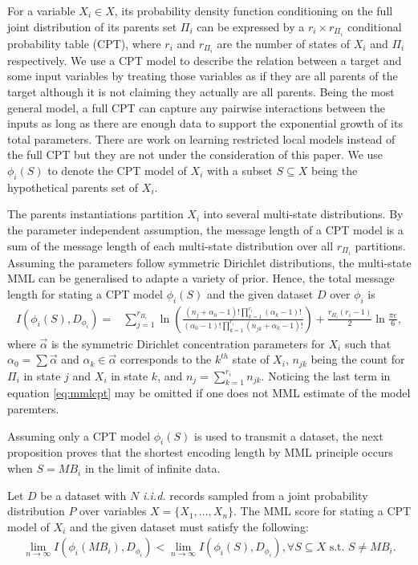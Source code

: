 For a variable $X_i \in X$, its probability density function conditioning on the full joint distribution of its parents set $\Pi_i$ can be expressed by a $r_i \times r_{\Pi_i}$ conditional probability table (CPT), where $r_i$ and $r_{\Pi_i}$ are the number of states of $X_i$ and $\Pi_i$ respectively. We use a CPT model to describe the relation between a target and some input variables by treating those variables as if they are all parents of the target although it is not claiming they actually are all parents. Being the most general model, a full CPT can capture any pairwise interactions between the inputs as long as there are enough data to support the exponential growth of its total parameters. There are work on learning restricted local models instead of the full CPT \cite{neil1999learning} but they are not under the consideration of this paper. We use $\phi_i(S)$ to denote the CPT model of $X_i$ with a subset $S \subseteq X$ being the hypothetical parents set of $X_i$.

The parents instantiations partition $X_i$ into several multi-state distributions. By the parameter independent assumption, the message length of a CPT model is a sum of the message length of each multi-state distribution over all $r_{\Pi_i}$ partitions. Assuming the parameters follow symmetric Dirichlet distributions, the multi-state MML can be generalised to adapte a variety of prior. Hence, the total message length for stating a CPT model $\phi_i(S)$ and the given dataset $D$ over ${\phi_i}$ is 
\begin{align}
\label{eq:mmlcpt}
I(\phi_i(S), D_{\phi_i}) = & \sum_{j = 1}^{r_{\Pi_i}} \ln \left(\frac{(n_j+\alpha_0-1)! \prod_{k=1}^{r_i} (\alpha_k - 1)!}{(\alpha_0-1)! \prod_{k=1}^{r_i} (n_{jk} + \alpha_k - 1)!} \right) + \frac{r_{\Pi_i}(r_i-1)}{2} \ln \frac{\pi e}{6},
\end{align}
where $\vec{\alpha}$ is the symmetric Dirichlet concentration parameters for $X_i$ such that $\alpha_0 = \sum \vec{\alpha}$ and $\alpha_k \in \vec{\alpha}$ corresponds to the $k^{th}$ state of $X_i$, $n_{jk}$ being the count for $\Pi_i$ in state $j$ and $X_i$ in state $k$, and $n_j = \sum_{k=1}^{r_i} n_{jk}$. Noticing the last term in equation \ref{eq:mmlcpt} may be omitted if one does not MML estimate of the model paremters. 

Assuming only a CPT model $\phi_i(S)$ is used to transmit a dataset, the next proposition proves that the shortest encoding length by MML principle occurs when $S = MB_i$ in the limit of infinite data. 
\begin{proposition}
\label{prop:mmlcpt}
Let $D$ be a dataset with $N$ \textit{i.i.d.} records sampled from a joint probability distribution $P$ over variables $X=\{X_1, \dots, X_n\}$. The MML score for stating a CPT model of $X_i$ and the given dataset must satisfy the following: 
\begin{align*}
\lim\limits_{n\rightarrow \infty}I(\phi_i(MB_i), D_{\phi_i}) < \lim\limits_{n\rightarrow \infty}I(\phi_i(S), D_{\phi_i}), \forall S \subseteq X \text{ s.t. } S \neq MB_i.
\end{align*}
\end{proposition}


